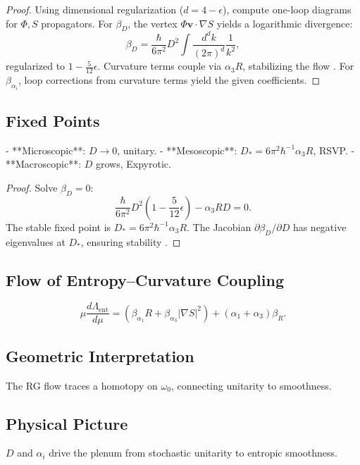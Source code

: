 \documentclass[12pt]{article}
\begin{document}
\begin{proof}
Using dimensional regularization (\(d = 4 - \epsilon\)), compute one-loop diagrams for \(\Phi, S\) propagators. For \(\beta_D\), the vertex \(\Phi \mathbf{v} \cdot \nabla S\) yields a logarithmic divergence:
\[
\beta_D = \frac{\hbar}{6 \pi^2} D^2 \int \frac{d^d k}{(2\pi)^d} \frac{1}{k^2},
\]
regularized to \(1 - \frac{5}{12} \epsilon\). Curvature terms couple via \(\alpha_3 R\), stabilizing the flow \citep{Wilson1983}. For \(\beta_{\alpha_i}\), loop corrections from curvature terms yield the given coefficients.
\end{proof}

\subsection{Fixed Points}

- **Microscopic**: \(D \to 0\), unitary.
- **Mesoscopic**: \(D_* = 6 \pi^2 \hbar^{-1} \alpha_3 R\), RSVP.
- **Macroscopic**: \(D\) grows, Expyrotic.

\begin{proof}
Solve \(\beta_D = 0\):
\[
\frac{\hbar}{6 \pi^2} D^2 \left(1 - \frac{5}{12} \epsilon \right) - \alpha_3 R D = 0.
\]
The stable fixed point is \(D_* = 6 \pi^2 \hbar^{-1} \alpha_3 R\). The Jacobian \(\partial \beta_D / \partial D\) has negative eigenvalues at \(D_*\), ensuring stability \citep{Wilson1983}.
\end{proof}

\subsection{Flow of Entropy–Curvature Coupling}

\[
\mu \frac{d \Lambda_{\mathrm{ent}}}{d \mu} = (\beta_{\alpha_1} R + \beta_{\alpha_3} |\nabla S|^2) + (\alpha_1 + \alpha_3) \beta_R.
\]

\subsection{Geometric Interpretation}

The RG flow traces a homotopy on \(\omega_0\), connecting unitarity to smoothness.

\subsection{Physical Picture}

\(D\) and \(\alpha_i\) drive the plenum from stochastic unitarity to entropic smoothness.
\end{document}
